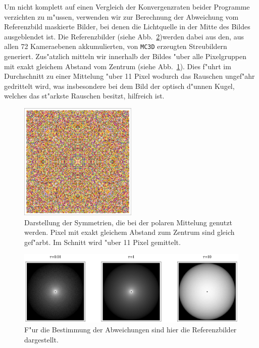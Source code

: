 	Um nicht komplett auf einen Vergleich der Konvergenzraten beider Programme verzichten zu m"ussen, verwenden wir zur Berechnung der Abweichung vom Referenzbild maskierte Bilder, bei denen die Lichtquelle in der Mitte des Bildes ausgeblendet ist.	 Die Referenzbilder (siehe Abb.~\ref{fig:sphere_reference_images})werden dabei aus den, aus allen 72 Kameraebenen akkumulierten, von \texttt{MC3D} erzeugten Streubildern generiert. Zus"atzlich mitteln wir innerhalb der Bildes "uber alle Pixelgruppen mit exakt gleichem Abstand vom Zentrum (siehe Abb.~\ref{fig:polaraveragingsymmetry}). Dies f"uhrt im Durchschnitt zu einer Mittelung "uber 11 Pixel wodurch das Rauschen ungef"ahr gedrittelt wird, was insbesondere bei dem Bild der optisch d"unnen Kugel, welches das st"arkste Rauschen besitzt, hilfreich ist.
	
		\begin{figure}
			\centering
			\includegraphics[width=0.5\textwidth]{polaraveragingsymmetry.eps}
			\caption{Darstellung der Symmetrien, die bei der polaren Mittelung genutzt werden. Pixel mit exakt gleichem Abstand zum Zentrum sind gleich gef"arbt. Im Schnitt wird "uber 11 Pixel gemittelt.}
			\label{fig:polaraveragingsymmetry}
		\end{figure}
		
		\begin{figure}
			\centering
			\includegraphics[width=1.0\textwidth]{spherereferenceimages.eps}
			\caption{F"ur die Bestimmung der Abweichungen sind hier die Referenzbilder dargestellt.}
			\label{fig:sphere_reference_images}
		\end{figure}
	

